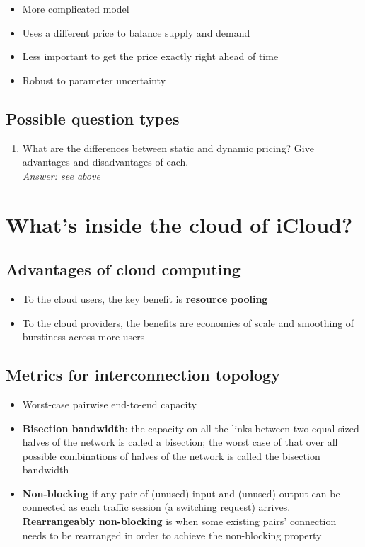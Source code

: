 \documentclass{article}
\begin{document}
\begin{itemize}
\item More complicated model
\item Uses a different price to balance supply and demand
\item Less important to get the price exactly right ahead of time
\item Robust to parameter uncertainty
\end{itemize}

\subsection{Possible question types}

\begin{enumerate}
\item What are the differences between static and dynamic pricing? Give advantages and disadvantages of each. \\
\textit{Answer: see above}
\end{enumerate}

\section{What's inside the cloud of iCloud?}

\subsection{Advantages of cloud computing}

\begin{itemize}
\item To the cloud users, the key benefit is \textbf{resource pooling}
\item To the cloud providers, the benefits are economies of scale and smoothing of burstiness across more users
\end{itemize}

\subsection{Metrics for interconnection topology}

\begin{itemize}
\item Worst-case pairwise end-to-end capacity
\item \textbf{Bisection bandwidth}: the capacity on all the links between two equal-sized halves of the network is called a bisection; the worst case of that over all possible combinations of halves of the network is called the bisection bandwidth
\item \textbf{Non-blocking} if any pair of (unused) input and (unused) output can be connected as each traffic session (a switching request) arrives. \textbf{Rearrangeably non-blocking} is when some existing pairs’ connection needs to be rearranged in order to achieve the non-blocking property
\end{itemize}
\end{document}
